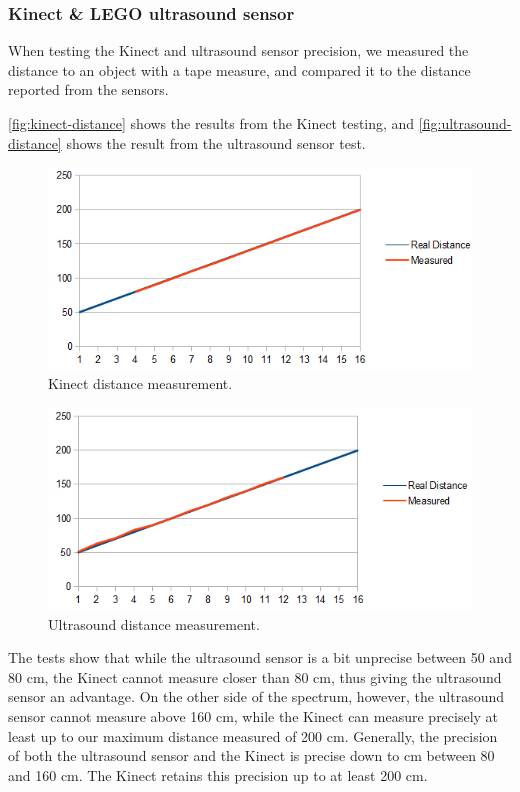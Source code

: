 \subsubsection{Kinect \& LEGO ultrasound sensor}
When testing the Kinect and ultrasound sensor precision, we measured the distance to an object with a tape measure, and compared it to the distance reported from the sensors.

\autoref{fig:kinect-distance} shows the results from the Kinect testing, and \autoref{fig:ultrasound-distance} shows the result from the ultrasound sensor test.

\begin{figure}[hbtp]
\includegraphics[width=\textwidth]{img/kinect-distance.png}
\caption{Kinect distance measurement.} 
\label{fig:kinect-distance} 
\end{figure}

\begin{figure}[hbtp]
\includegraphics[width=\textwidth]{img/ultrasound-distance.png}
\caption{Ultrasound distance measurement.} 
\label{fig:ultrasound-distance} 
\end{figure}

The tests show that while the ultrasound sensor is a bit unprecise between 50 and 80 cm, the Kinect cannot measure closer than 80 cm, thus giving the ultrasound sensor an advantage.
On the other side of the spectrum, however, the ultrasound sensor cannot measure above 160 cm, while the Kinect can measure precisely at least up to our maximum distance measured of 200 cm.
Generally, the precision of both the ultrasound sensor and the Kinect is precise down to  cm between 80 and 160 cm. The Kinect retains this precision up to at least 200 cm.


